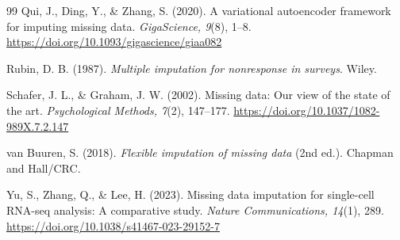 \documentclass[10pt, a4paper]{article}
\begin{document}
\begin{thebibliography}{99}
 Qui, J., Ding, Y., \& Zhang, S. (2020). A variational autoencoder framework for imputing missing data. \textit{GigaScience, 9}(8), 1–8. \url{https://doi.org/10.1093/gigascience/giaa082}

 Rubin, D. B. (1987). \textit{Multiple imputation for nonresponse in surveys}. Wiley.

 Schafer, J. L., \& Graham, J. W. (2002). Missing data: Our view of the state of the art. \textit{Psychological Methods, 7}(2), 147–177. \url{https://doi.org/10.1037/1082-989X.7.2.147}

 van Buuren, S. (2018). \textit{Flexible imputation of missing data} (2nd ed.). Chapman and Hall/CRC.

 Yu, S., Zhang, Q., \& Lee, H. (2023). Missing data imputation for single-cell RNA-seq analysis: A comparative study. \textit{Nature Communications, 14}(1), 289. \url{https://doi.org/10.1038/s41467-023-29152-7}

\end{thebibliography}
\end{document}
